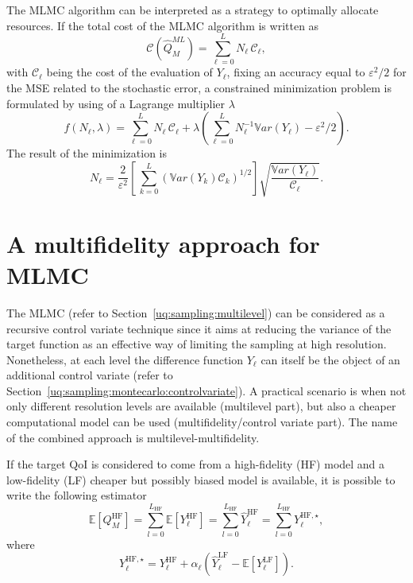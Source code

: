The MLMC algorithm can be interpreted as a strategy to optimally allocate resources. If the total cost of the
MLMC algorithm is written as  
\begin{equation}\label{EQ: MLMC cost}
\mathcal{C}(\hat{Q}^{ML}_{M}) = \sum_{\ell=0}^{L} N_\ell \, \mathcal{C}_{\ell},
\end{equation}
with $\mathcal{C}_{\ell}$ being the cost of the evaluation of $Y_\ell$, fixing an accuracy equal to $\varepsilon^2/2$ 
for the MSE related to the stochastic error, a constrained minimization 
problem is formulated by using of a Lagrange multiplier $\lambda$
\begin{equation}\label{EQ:mlmc_optimization}
 f(N_\ell,\lambda) = \sum_{\ell=0}^{L} N_\ell \, \mathcal{C}_{\ell} 
                   + \lambda \left( \sum_{\ell=0}^{L} N_\ell^{-1} \mathbb{V}ar\left({Y_\ell}\right) - \varepsilon^2/2 \right). 
\end{equation}
The result of the minimization is
\begin{equation}\label{EQ: MLMC nl}
N_{\ell} = \frac{2}{\varepsilon^2} \left[ \, \sum_{k=0}^L \left( \mathbb{V}ar\left(Y_k\right) \mathcal{C}_k \right)^{1/2} \right] 
               \sqrt{\frac{ \mathbb{V}ar\left({Y_\ell}\right) }{\mathcal{C}_{\ell}}}.
\end{equation}


\section{A multifidelity approach for MLMC} \label{uq:sampling:multifidelity}
The MLMC (refer to Section~\ref{uq:sampling:multilevel}) can be considered as a recursive control variate technique 
since it aims at reducing the variance of the target function as an effective way of limiting the sampling at high 
resolution. Nonetheless, at each level the difference function $Y_\ell$ can itself be the object of an additional 
control variate (refer to Section~\ref{uq:sampling:montecarlo:controlvariate}). A practical scenario is when not only 
different resolution levels are available (multilevel part), but also a cheaper computational model can be used 
(multifidelity/control variate part). The name of the combined approach is multilevel-multifidelity.

If the target QoI is considered to come from a high-fidelity (HF) model and a low-fidelity (LF) cheaper but possibly biased
model is available, it is possible to write the following estimator
\begin{equation}\label{EQ: MLMF estimator}
 \mathbb{E}\left[Q_M^{\mathrm{HF}}\right] = \sum_{l=0}^{L_{\mathrm{HF}}} \mathbb{E}\left[Y^{\mathrm{HF}}_{\ell}\right] 
                                          = \sum_{l=0}^{L_{\mathrm{HF}}} \hat{Y}^{\mathrm{HF}}_{\ell} = \sum_{l=0}^{L_{\mathrm{HF}}} Y^{{\mathrm{HF}},\star}_{\ell},
\end{equation}
where
\begin{equation}
 Y^{{\mathrm{HF}},\star}_{\ell} = Y^{\mathrm{HF}}_{\ell} + \alpha_\ell \left( \hat{Y}^{\mathrm{LF}}_{\ell} - \mathbb{E}\left[{Y^{\mathrm{LF}}_{\ell}}\right] \right).
\end{equation}

